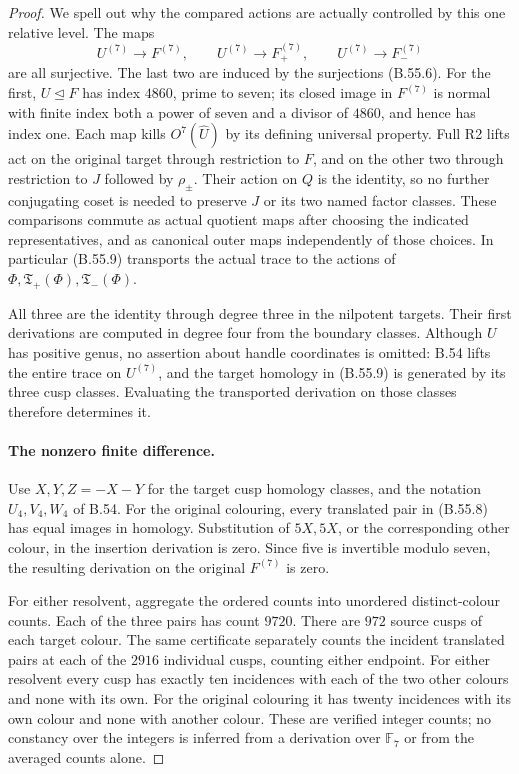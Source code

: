 \begin{proof}
We spell out why the compared actions are actually
controlled by this one relative level. The maps
\[
 U^{(7)}\longrightarrow F^{(7)},\qquad
 U^{(7)}\longrightarrow F_+^{(7)},\qquad
 U^{(7)}\longrightarrow F_-^{(7)}                          \tag{B.55.9}
\]
are all surjective. The last two are induced by the
surjections (B.55.6). For the first, $U\trianglelefteq F$
has index $4860$, prime to seven; its closed image in
$F^{(7)}$ is normal with finite index both a power of
seven and a divisor of $4860$, and hence has index one.
Each map kills $O^7(\widehat U)$ by its defining universal
property. Full R2 lifts act on the original target
through restriction to $F$, and on the other two through
restriction to $J$ followed by $\rho_\pm$. Their action
on $Q$ is the identity, so no further conjugating coset
is needed to preserve $J$ or its two named factor
classes. These comparisons commute as actual quotient
maps after choosing the indicated representatives, and
as canonical outer maps independently of those choices.
In particular (B.55.9) transports the actual trace to
the actions of $\Phi,\mathfrak T_+(\Phi),\mathfrak T_-(\Phi)$.

All three are the identity through degree three in the
nilpotent targets. Their first derivations are computed
in degree four from the boundary classes. Although $U$
has positive genus, no assertion about handle coordinates
is omitted: B.54 lifts the entire trace on $U^{(7)}$,
and the target homology in (B.55.9) is generated by its
three cusp classes. Evaluating the transported derivation
on those classes therefore determines it.

\paragraph{The nonzero finite difference.}
Use $X,Y,Z=-X-Y$ for the target cusp homology classes,
and the notation $U_4,V_4,W_4$ of B.54. For the original
colouring, every translated pair in (B.55.8) has equal
images in homology. Substitution of $5X,5X$, or the
corresponding other colour, in the insertion derivation
is zero. Since five is invertible modulo seven, the
resulting derivation on the original $F^{(7)}$ is zero.

For either resolvent, aggregate the ordered counts into
unordered distinct-colour counts. Each of the three
pairs has count $9720$. There are $972$ source cusps of
each target colour. The same certificate separately
counts the incident translated pairs at each of the
$2916$ individual cusps, counting either endpoint.
For either resolvent every cusp has exactly ten
incidences with each of the two other colours and
none with its own. For the original colouring it
has twenty incidences with its own colour and none
with another colour. These are verified integer
counts; no constancy over the integers is inferred
from a derivation over $\mathbb F_7$ or from the
averaged counts alone.


\end{proof}
